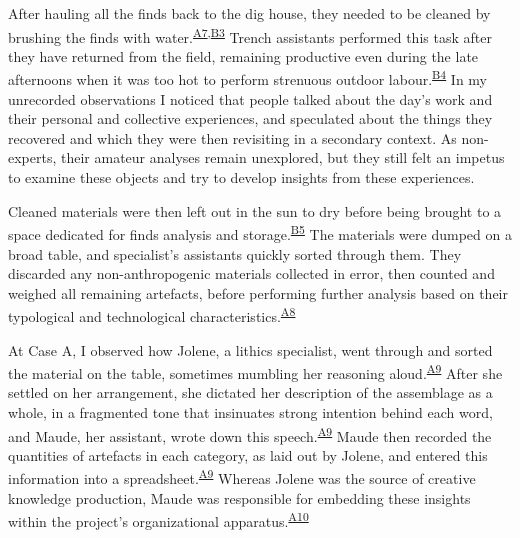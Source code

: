 \documentclass[
  canadian,
]{article}
\begin{document}
After hauling all the finds back to the dig house, they needed to be
cleaned by brushing the finds with
water.\textsuperscript{\hyperref[sec-A7]{A7},\hyperref[sec-B3]{B3}}
Trench assistants performed this task after they have returned from the
field, remaining productive even during the late afternoons when it was
too hot to perform strenuous outdoor
labour.\textsuperscript{\hyperref[sec-B4]{B4}} In my unrecorded
observations I noticed that people talked about the day's work and their
personal and collective experiences, and speculated about the things
they recovered and which they were then revisiting in a secondary
context. As non-experts, their amateur analyses remain unexplored, but
they still felt an impetus to examine these objects and try to develop
insights from these experiences.

Cleaned materials were then left out in the sun to dry before being
brought to a space dedicated for finds analysis and
storage.\textsuperscript{\hyperref[sec-B5]{B5}} The materials were
dumped on a broad table, and specialist's assistants quickly sorted
through them. They discarded any non-anthropogenic materials collected
in error, then counted and weighed all remaining artefacts, before
performing further analysis based on their typological and technological
characteristics.\textsuperscript{\hyperref[sec-A8]{A8}}

At Case A, I observed how Jolene, a lithics specialist, went through and
sorted the material on the table, sometimes mumbling her reasoning
aloud.\textsuperscript{\hyperref[sec-A9]{A9}} After she settled on her
arrangement, she dictated her description of the assemblage as a whole,
in a fragmented tone that insinuates strong intention behind each word,
and Maude, her assistant, wrote down this
speech.\textsuperscript{\hyperref[sec-A9]{A9}} Maude then recorded the
quantities of artefacts in each category, as laid out by Jolene, and
entered this information into a
spreadsheet.\textsuperscript{\hyperref[sec-A9]{A9}} Whereas Jolene was
the source of creative knowledge production, Maude was responsible for
embedding these insights within the project's organizational
apparatus.\textsuperscript{\hyperref[sec-A10]{A10}}
\end{document}

